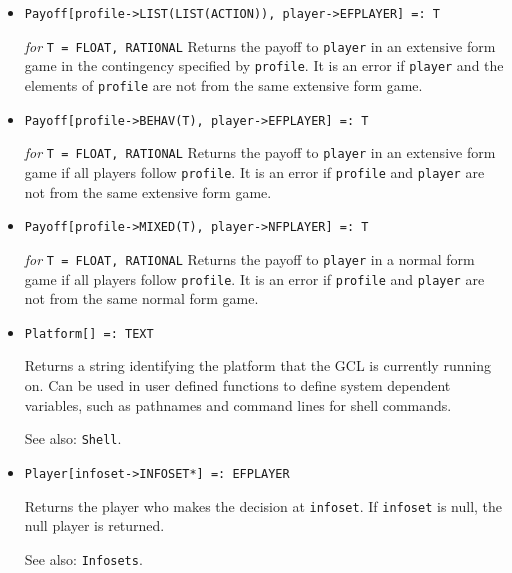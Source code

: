 \begin{itemize}
\item
\protect \large \begin{verbatim}
Payoff[profile->LIST(LIST(ACTION)), player->EFPLAYER] =: T
\end{verbatim}\normalsize

{\it for} {\tt T = FLOAT, RATIONAL}
\bd
Returns the payoff to \verb+player+ in an extensive form game in the
contingency specified by \verb+profile+.  It is an error if
\verb+player+ and the elements of \verb+profile+ are not from the
same extensive form game.
\ed

\item
\protect \large \begin{verbatim}
Payoff[profile->BEHAV(T), player->EFPLAYER] =: T
\end{verbatim}\normalsize

{\it for} {\tt T = FLOAT, RATIONAL}
\bd
Returns the payoff to \verb+player+ in an extensive form game if all
players follow \verb+profile+.  It is an error if \verb+profile+
and \verb+player+ are not from the same extensive form game.
\ed

\item
\protect \large \begin{verbatim}
Payoff[profile->MIXED(T), player->NFPLAYER] =: T
\end{verbatim}\normalsize

{\it for} {\tt T = FLOAT, RATIONAL}
\bd
Returns the payoff to \verb+player+ in a normal form game if all players
follow \verb+profile+.  It is an error if \verb+profile+ and \verb+player+
are not from the same normal form game.
\ed

\item
\protect \large \begin{verbatim}
Platform[] =: TEXT
\end{verbatim} \normalsize

\bd 
Returns a string identifying the platform that the GCL is
currently running on.  Can be used in user defined functions to define
system dependent variables, such as pathnames and command lines for
shell commands.  
\item [See also:] \verb+Shell+.
\ed

\item
\protect \large \begin{verbatim}
Player[infoset->INFOSET*] =: EFPLAYER
\end{verbatim}\normalsize

\bd
Returns the player who makes the decision at \verb+infoset+.
If \verb+infoset+ is null, the null player is returned.
\item [See also:] \verb+Infosets+.
\ed


\end{itemize}
